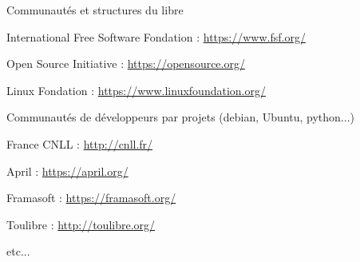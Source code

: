 \documentclass{beamer}
\begin{document}
\begin{frame}[plain]%
%  
\end{frame}


\begin{frame}[plain]%
%  
\end{frame}

\begin{frame}[plain]%
%  
\end{frame}

\begin{frame}{Communautés et structures du libre}

  \begin{block}{International}
    Free Software Fondation : \url{https://www.fsf.org/}

    Open Source Initiative : \url{https://opensource.org/}

    Linux Fondation : \url{https://www.linuxfoundation.org/}

    Communautés de développeurs par projets (debian, Ubuntu, python...)
  \end{block}

\pause

  \begin{block}{France}
    CNLL : \url{http://cnll.fr/}

    April : \url{https://april.org/}

    Framasoft : \url{https://framasoft.org/}

    Toulibre : \url{http://toulibre.org/}

    etc...
  \end{block}
\end{frame}
\end{document}

